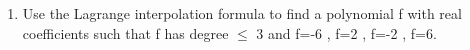 \renewcommand{\theequation}{\theenumi}
\renewcommand{\thefigure}{\theenumi}
\begin{enumerate}[label=\thesubsection.\arabic*.,ref=\thesubsection.\theenumi]

\item Use the Lagrange interpolation formula to find a polynomial f with real coefficients such that f has degree $\leq$ 3 and f=-6 , f=2 , f=-2 , f=6.
%
\\
\solution

\end{enumerate}

